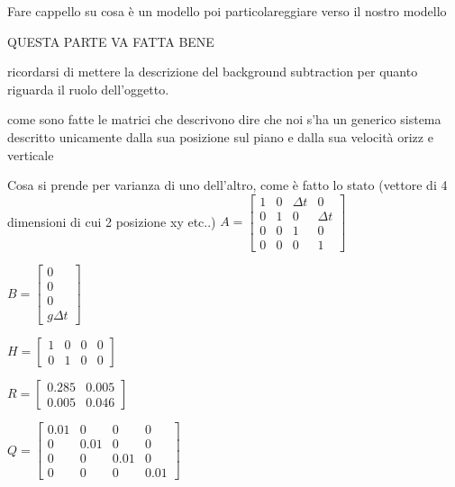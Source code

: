 Fare cappello su cosa è un modello poi particolareggiare verso il nostro modello

QUESTA PARTE VA FATTA BENE

ricordarsi di mettere la descrizione del background subtraction per quanto riguarda il ruolo dell'oggetto.

come sono fatte le matrici che descrivono 
dire che noi s'ha un generico sistema descritto unicamente dalla sua posizione sul piano e dalla sua velocità orizz e verticale

Cosa si prende per varianza di uno dell'altro, come è fatto lo stato (vettore di 4 dimensioni di cui 2 posizione xy etc..)
$ A = 
\begin{bmatrix}
 1 & 0 & \Delta t & 0 \\
 0 & 1 & 0 & \Delta t \\
 0 & 0 & 1 & 0 \\
 0 & 0 & 0 & 1
\end{bmatrix}
$

$ B =\begin{bmatrix} 0 \\ 0 \\ 0 \\ g \Delta t \end{bmatrix}$

$ H = \begin{bmatrix} 
1 & 0 & 0 & 0\\
0 & 1 & 0 & 0
\end{bmatrix} $

$ R = \begin{bmatrix} 
0.285 & 0.005\\
0.005 & 0.046
\end{bmatrix} $

$ Q = \begin{bmatrix} 
0.01 & 0 & 0 & 0\\
0 & 0.01 & 0 & 0\\
0 & 0 & 0.01 & 0\\
0 & 0 & 0 & 0.01
\end{bmatrix} $
